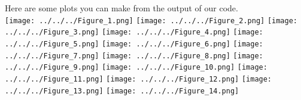 \documentclass[a4paper,fleqn]{report}
\begin{document}
Here are some plots you can make from the output of our code.\\


\texttt{[image: ../../../Figure\_1.png]}
\texttt{[image: ../../../Figure\_2.png]}
\texttt{[image: ../../../Figure\_3.png]}
\texttt{[image: ../../../Figure\_4.png]}
\texttt{[image: ../../../Figure\_5.png]}
\texttt{[image: ../../../Figure\_6.png]}
\texttt{[image: ../../../Figure\_7.png]}
\texttt{[image: ../../../Figure\_8.png]}
\texttt{[image: ../../../Figure\_9.png]}
\texttt{[image: ../../../Figure\_10.png]}
\texttt{[image: ../../../Figure\_11.png]}
\texttt{[image: ../../../Figure\_12.png]}
\texttt{[image: ../../../Figure\_13.png]}
\texttt{[image: ../../../Figure\_14.png]}
\end{document}
